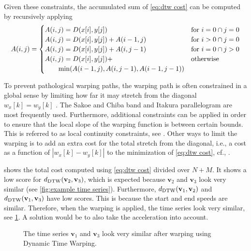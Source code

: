 \documentclass[10pt,final,a4paper,oneside,onecolumn]{article}
\newlength\figurewidth
\newlength\figureheight
\newcommand{\ddtw}{d_{\textup{DTW}}}
\newcommand{\profile}[1]{\textbf{v}_{#1}}
\theoremstyle{plain}\newtheorem{definition}{Definition}[section]    %
\theoremstyle{definition}\newtheorem{example}{Example}[section]     %
\theoremstyle{remark}\newtheorem{remarkenv}{Remark}[section]        %
\begin{document}
Given these constraints, the accumulated sum of \cref{eq:dtw cost} can be computed by recursively applying
\begin{equation}
	A(i, j) = \begin{cases}
		A(i, j) = D(x[i], y[j]) & \textup{for}\,\, i=0 \cap j=0 \\
		A(i, j) = D(x[i], y[j]) + A(i-1, j) & \textup{for}\,\, i>0 \cap j=0 \\
		A(i, j) = D(x[i], y[j]) + A(i, j-1) & \textup{for}\,\, i=0 \cap j>0 \\
		A(i, j) = D(x[i], y[j]) + & \textup{otherwise} \\
		\qquad \min(A(i-1, j), A(i, j-1), A(i-1, j-1)) & 
	\end{cases}
\end{equation}

To prevent pathological warping paths, the warping path is often constrained in a global sense by limiting how far it may stretch from the diagonal $w_x[k]=w_y[k]$ \cite{keogh2005exactDTW}. The Sakoe and Chiba band \cite{sakoe1978dynamic} and Itakura parallelogram \cite{itakura1975minimum} are most frequently used. Furthermore, additional constraints can be applied in order to ensure that the local slope of the warping function is between certain bounds. This is referred to as local continuity constraints, see \cite{rabiner1993speech}. Other ways to limit the warping is to add an extra cost for the total stretch from the diagonal, i.e., a cost as a function of $|w_x[k] - w_y[k]|$ to the minimization of \cref{eq:dtw cost}, cf., \cite{roberts1987enhancements, wang1997alignment}.

 shows the total cost computed using \cref{eq:dtw cost} divided over $N+M$. It shows a low score for $\ddtw(\profile{2}, \profile{3})$, which is expected because $\profile{2}$ and $\profile{3}$ look very similar (see \cref{fig:example time series}). Furthermore, $\ddtw(\profile{1}, \profile{2})$ and $\ddtw(\profile{1}, \profile{3})$ have low scores. This is because the start and end speeds are similar. Therefore, when the warping is applied, the time series look very similar, see \cref{fig:example dtw}. A solution would be to also take the acceleration into account.

\begin{figure}
	\centering
	\setlength{}
	\setlength{}
	
	\caption{The time series $\profile{1}$ and $\profile{3}$ look very similar after warping using Dynamic Time Warping.}
	\label{fig:example dtw}
\end{figure}


\printbibliography
\end{document}
